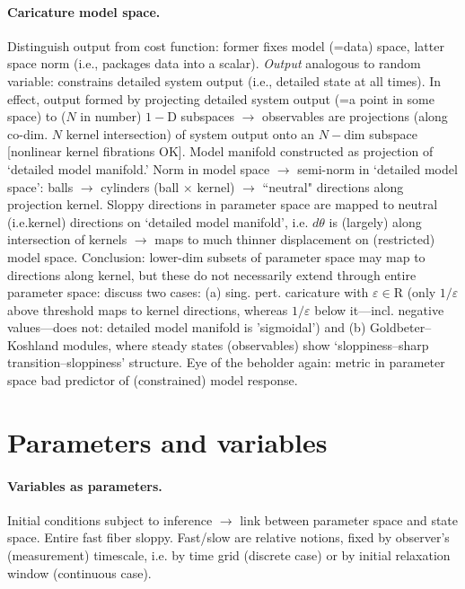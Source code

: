 \documentclass{article}
\newcommand{\eps}{\varepsilon}
\newcommand{\R}{\mathrm{R}}
\begin{document}
\paragraph{Caricature model space.}
Distinguish output from cost function: former fixes model (=data)
space, latter space norm (i.e., packages data into a scalar).
\emph{Output} analogous to random variable: constrains detailed system
output (i.e., detailed state at all times).  In effect, output formed
by projecting detailed system output (=a point in some space) to ($N$
in number) $1-$D subspaces $\rightarrow$ observables are projections
(along co-dim. $N$ kernel intersection) of system output onto an
$N-$dim subspace [nonlinear kernel fibrations OK].  Model manifold
constructed as projection of `detailed model manifold.'  Norm in model
space $\rightarrow$ semi-norm in `detailed model space': balls
$\rightarrow$ cylinders (ball $\times$ kernel) $\rightarrow$
``neutral" directions along projection kernel.  Sloppy directions in
parameter space are mapped to neutral (i.e.kernel) directions on
`detailed model manifold', i.e. $d\theta$ is (largely) along
intersection of kernels $\rightarrow$ maps to much thinner
displacement on (restricted) model space.  Conclusion: lower-dim
subsets of parameter space may map to directions along kernel, but
these do not necessarily extend through entire parameter space:
discuss two cases: (a) sing. pert. caricature with $\eps\in\R$ (only
$1/\eps$ above threshold maps to kernel directions, whereas $1/\eps$
below it---incl. negative values---does not: detailed model manifold
is 'sigmoidal') and (b) Goldbeter--Koshland modules, where steady
states (observables) show `sloppiness--sharp transition--sloppiness'
structure.  Eye of the beholder again: metric in parameter space bad
predictor of (constrained) model response.

\section{Parameters and variables}

\paragraph{Variables as parameters.}
Initial conditions subject to inference $\rightarrow$ link between
parameter space and state space.  Entire fast fiber sloppy.  Fast/slow
are relative notions, fixed by observer's (measurement) timescale,
i.e. by time grid (discrete case) or by initial relaxation window
(continuous case).
\end{document}
